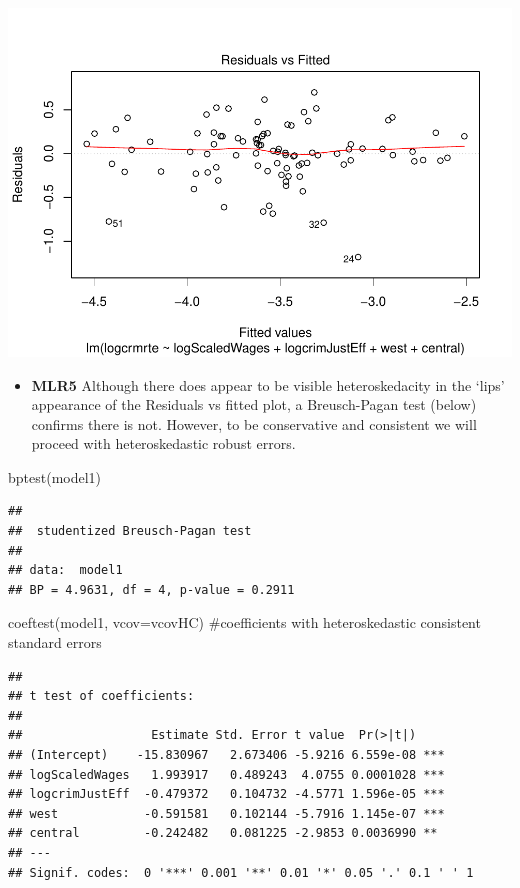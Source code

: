 \documentclass[]{article}
\newenvironment{Shaded}{}{}
\newcommand{\CommentTok}[1]{\textcolor[rgb]{0.00,0.50,0.00}{#1}}
\newcommand{\DataTypeTok}[1]{#1}
\newcommand{\KeywordTok}[1]{\textcolor[rgb]{0.00,0.00,1.00}{#1}}
\newcommand{\NormalTok}[1]{#1}
\providecommand{\tightlist}{%
  \setlength{\itemsep}{0pt}\setlength{\parskip}{0pt}}
\begin{document}
\includegraphics{Bagnard_Gaustad_Hartman_Leung_Lab_3_files/figure-latex/unnamed-chunk-61-1.pdf}

\begin{itemize}
\tightlist
\item
  \textbf{MLR5} Although there does appear to be visible heteroskedacity
  in the `lips' appearance of the Residuals vs fitted plot, a
  Breusch-Pagan test (below) confirms there is not. However, to be
  conservative and consistent we will proceed with heteroskedastic
  robust errors.
\end{itemize}

\begin{Shaded}
\begin{Highlighting}[]
\KeywordTok{bptest}\NormalTok{(model1)}
\end{Highlighting}
\end{Shaded}

\begin{verbatim}
## 
##  studentized Breusch-Pagan test
## 
## data:  model1
## BP = 4.9631, df = 4, p-value = 0.2911
\end{verbatim}

\begin{Shaded}
\begin{Highlighting}[]
\KeywordTok{coeftest}\NormalTok{(model1, }\DataTypeTok{vcov=}\NormalTok{vcovHC) }\CommentTok{#coefficients with heteroskedastic consistent standard errors}
\end{Highlighting}
\end{Shaded}

\begin{verbatim}
## 
## t test of coefficients:
## 
##                  Estimate Std. Error t value  Pr(>|t|)    
## (Intercept)    -15.830967   2.673406 -5.9216 6.559e-08 ***
## logScaledWages   1.993917   0.489243  4.0755 0.0001028 ***
## logcrimJustEff  -0.479372   0.104732 -4.5771 1.596e-05 ***
## west            -0.591581   0.102144 -5.7916 1.145e-07 ***
## central         -0.242482   0.081225 -2.9853 0.0036990 ** 
## ---
## Signif. codes:  0 '***' 0.001 '**' 0.01 '*' 0.05 '.' 0.1 ' ' 1
\end{verbatim}
\end{document}
